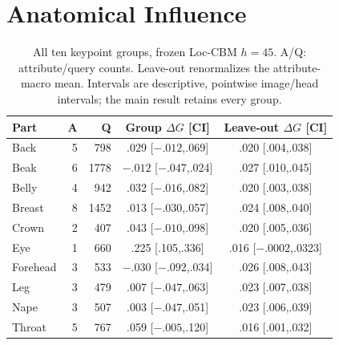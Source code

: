 \section{Anatomical Influence}\label{app:parts}
\begin{table}[H]\centering\small
\caption{All ten keypoint groups, frozen Loc-CBM $h=45$. A/Q: attribute/query counts. Leave-out renormalizes the attribute-macro mean. Intervals are descriptive, pointwise image/head intervals; the main result retains every group.}\label{tab:parts}
\setlength{\tabcolsep}{3pt}
\begin{tabular}{lrrcc}\toprule
Part & A & Q & Group $\Delta G$ [CI] & Leave-out $\Delta G$ [CI]\\\midrule
Back & 5 & 798 & .029 [$-.012$,.069] & .020 [.004,.038]\\
Beak & 6 & 1778 & $-.012$ [$-.047$,.024] & .027 [.010,.045]\\
Belly & 4 & 942 & .032 [$-.016$,.082] & .020 [.003,.038]\\
Breast & 8 & 1452 & .013 [$-.030$,.057] & .024 [.008,.040]\\
Crown & 2 & 407 & .043 [$-.010$,.098] & .020 [.005,.036]\\
Eye & 1 & 660 & .225 [.105,.336] & .016 [$-.0002$,.0323]\\
Forehead & 3 & 533 & $-.030$ [$-.092$,.034] & .026 [.008,.043]\\
Leg & 3 & 479 & .007 [$-.047$,.063] & .023 [.007,.038]\\
Nape & 3 & 507 & .003 [$-.047$,.051] & .023 [.006,.039]\\
Throat & 5 & 767 & .059 [$-.005$,.120] & .016 [.001,.032]\\
\bottomrule\end{tabular}\end{table}
